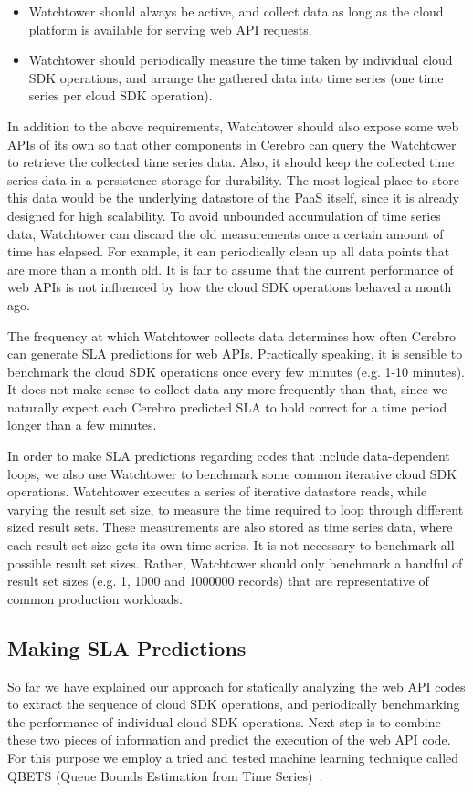 \begin{itemize}
\item Watchtower should always be active, and collect data as long as the cloud platform is available for serving web API requests.
\item Watchtower should periodically measure the time taken by individual cloud SDK operations, and arrange the gathered data into time series (one time series per cloud SDK operation).
\end{itemize}

In addition to the above requirements, Watchtower should also expose some web APIs of its own 
so that other components in Cerebro can query the Watchtower to retrieve the collected time series data. Also,
it should keep the collected time series data in a persistence storage for durability. The most logical
place to store this data would be the underlying datastore of the PaaS itself, since it is already designed
for high scalability. To avoid unbounded accumulation of time series data, Watchtower can discard the old
measurements once a certain amount of time has elapsed. For example, it can periodically clean up
all data points that are more than a month old. It is fair to assume that the current performance of web APIs
is not influenced by how the cloud SDK operations behaved a month ago.

The frequency at which
Watchtower collects data determines how often Cerebro can generate SLA predictions for web APIs. Practically
speaking, it is sensible to benchmark the cloud SDK operations once every few minutes (e.g. 1-10 minutes). It does not make
sense to collect data any more frequently than that, since we naturally expect each Cerebro predicted SLA to 
hold correct for a time period longer than a few minutes.

In order to make SLA predictions regarding codes that include data-dependent loops, we also use Watchtower
to benchmark some common iterative cloud SDK operations. 
Watchtower executes a series of iterative datastore reads,
while varying the result set size, to measure the time required to loop through different sized result sets. These
measurements are also stored as time series data, where each result set size gets its own time series. 
It is not necessary to benchmark all possible result set sizes. Rather, Watchtower should only benchmark a
handful of result set sizes  (e.g. 1, 1000 and 1000000 records) that are representative of common 
production workloads.

\subsection{Making SLA Predictions}
So far we have explained our approach for statically analyzing the web API codes to extract the sequence
of cloud SDK operations, and periodically benchmarking the performance of individual cloud SDK
operations. Next step is to combine these two pieces of information and predict the execution of the
web API code. For this purpose we employ a tried and tested machine learning technique called
QBETS (Queue Bounds Estimation from Time Series)~\cite{Nurmi:2007:QQB:1791551.1791556}. 

